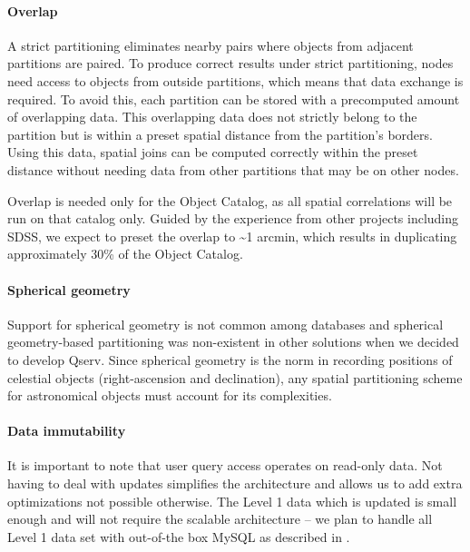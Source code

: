 \documentclass[DM,lsstdraft,toc]{lsstdoc}
\begin{document}
\paragraph{Overlap}\label{overlap}

A strict partitioning eliminates nearby pairs where objects from
adjacent partitions are paired. To produce correct results under strict
partitioning, nodes need access to objects from outside partitions,
which means that data exchange is required. To avoid this, each
partition can be stored with a precomputed amount of overlapping data.
This overlapping data does not strictly belong to the partition but is
within a preset spatial distance from the partition's borders. Using
this data, spatial joins can be computed correctly within the preset
distance without needing data from other partitions that may be on other
nodes.

Overlap is needed only for the Object Catalog, as all spatial
correlations will be run on that catalog only. Guided by the experience
from other projects including SDSS, we expect to preset the overlap to
\textasciitilde{}1 arcmin, which results in duplicating approximately
30\% of the Object Catalog.

\paragraph{Spherical geometry}\label{spherical-geometry}

Support for spherical geometry is not common among databases and
spherical geometry-based partitioning was non-existent in other
solutions when we decided to develop Qserv. Since spherical geometry is
the norm in recording positions of celestial objects (right-ascension
and declination), any spatial partitioning scheme for astronomical
objects must account for its complexities.

\paragraph{Data immutability}\label{data-immutability}

It is important to note that user query access operates on read-only
data. Not having to deal with updates simplifies the architecture and
allows us to add extra optimizations not possible otherwise. The Level 1
data which is updated is small enough and will not require the scalable
architecture -- we plan to handle all Level 1 data set with out-of-the
box MySQL as described in .
\end{document}
